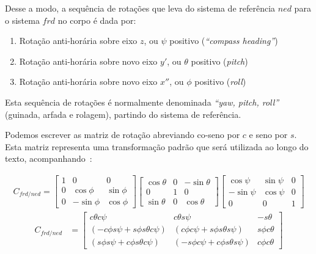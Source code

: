 Desse a modo, a sequência de rotações que leva do sistema de referência \(ned\) para o sistema \(frd\) no corpo é dada por:
\begin{enumerate}
    \item Rotação anti-horária sobre eixo \(z\), ou \(\psi\) positivo (\textit{``compass heading''})
    \item Rotação anti-horária sobre novo eixo \(y'\), ou \(\theta\) positivo (\textit{pitch})
    \item Rotação anti-horária sobre novo eixo \(x''\), ou \(\phi\) positivo (\textit{roll})
\end{enumerate}

Esta sequência de rotações é normalmente denominada \emph{``yaw, pitch, roll''} (guinada, arfada e rolagem), partindo do sistema de referência.

Podemos escrever as matriz de rotação abreviando co-seno por \(c\) e seno por \(s\). Esta matriz representa uma transformação padrão que será utilizada ao longo do texto, acompanhando~\cite{Stevens2016}:

\begin{align*}
    C_{f\!r\!d\!/\!n\!e\!d} =
    \begin{bmatrix}
        1               &  0            &  0             \\
        0               &  \cos{\phi}   &  \sin{\phi}    \\
        0               & -\sin{\phi}   &  \cos{\phi}
    \end{bmatrix}
    \begin{bmatrix}
        \cos{ \theta}   &  0            & -\sin{\theta} \\
        0               &  1            &  0            \\
        \sin{ \theta}   &  0            &  \cos{\theta}
    \end{bmatrix}
    \begin{bmatrix}
        \cos{\psi}      &  \sin{\psi}   &  0             \\
       -\sin{\psi}      &  \cos{\psi}   &  0             \\
        0               &  0            &  1
    \end{bmatrix}
\end{align*}
\begin{align} \tag{1.3-10}
    C_{f\!r\!d\!/\!n\!e\!d} &=
    \begin{bmatrix}
        c\theta c\psi   & c\theta s\psi & -s\theta    \\
        \left(-c\phi s\psi + s\phi s\theta c\psi \right) 
        &  \left( c\phi c\psi + s\phi s\theta s\psi \right) 
        &  s\phi c\theta                                 \\
        \left( s\phi s\psi + c\phi s\theta c\psi \right) 
        &  \left( -s\phi c\psi + c\phi s\theta s\psi \right) 
        & c\phi c\theta
    \end{bmatrix}
\end{align}

